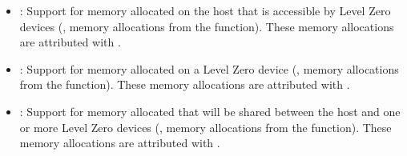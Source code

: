 \begin{itemize}

\item {}: Support for memory allocated on the host that is
    accessible by Level Zero devices (\eg, memory allocations from the
         function).
        These memory allocations are attributed with .

\item {}: Support for memory allocated on a Level Zero device
    (\eg, memory allocations from the  function). 
        These memory allocations are attributed with .

\item {}: Support for memory allocated that will be shared
    between the host and one or more Level Zero devices (\eg,
        memory allocations from the  function).
        These memory allocations are attributed with .

\end{itemize}
